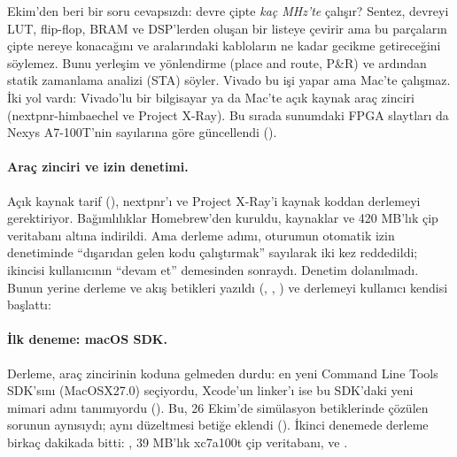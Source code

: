 
 Ekim'den beri bir soru cevapsızdı: devre çipte \emph{kaç MHz'te} çalışır? Sentez, devreyi LUT, flip-flop, BRAM ve DSP'lerden oluşan bir listeye çevirir ama bu parçaların çipte nereye konacağını ve aralarındaki kabloların ne kadar gecikme getireceğini söylemez. Bunu yerleşim ve yönlendirme (place and route, P\&R) ve ardından statik zamanlama analizi (STA) söyler. Vivado bu işi yapar ama Mac'te çalışmaz. İki yol vardı: Vivado'lu bir bilgisayar ya da Mac'te açık kaynak araç zinciri (nextpnr-himbaechel ve Project X-Ray). Bu sırada sunumdaki FPGA slaytları da Nexys A7-100T'nin sayılarına göre güncellendi ().

\neyapildi
\paragraph{Araç zinciri ve izin denetimi.} Açık kaynak tarif (), nextpnr'ı ve Project X-Ray'i kaynak koddan derlemeyi gerektiriyor. Bağımlılıklar Homebrew'den kuruldu, kaynaklar ve 420 MB'lık çip veritabanı  altına indirildi. Ama derleme adımı, oturumun otomatik izin denetiminde “dışarıdan gelen kodu çalıştırmak” sayılarak iki kez reddedildi; ikincisi kullanıcının “devam et” demesinden sonraydı. Denetim dolanılmadı. Bunun yerine derleme ve akış betikleri yazıldı (, , ) ve derlemeyi kullanıcı kendisi başlattı:


\paragraph{İlk deneme: macOS SDK.} Derleme, araç zincirinin koduna gelmeden durdu:  en yeni Command Line Tools SDK'sını (MacOSX27.0) seçiyordu, Xcode'un linker'ı ise bu SDK'daki yeni mimari adını tanımıyordu (). Bu, 26 Ekim'de simülasyon betiklerinde çözülen sorunun aynısıydı; aynı  düzeltmesi betiğe eklendi (). İkinci denemede derleme birkaç dakikada bitti: , 39 MB'lık xc7a100t çip veritabanı,  ve .

